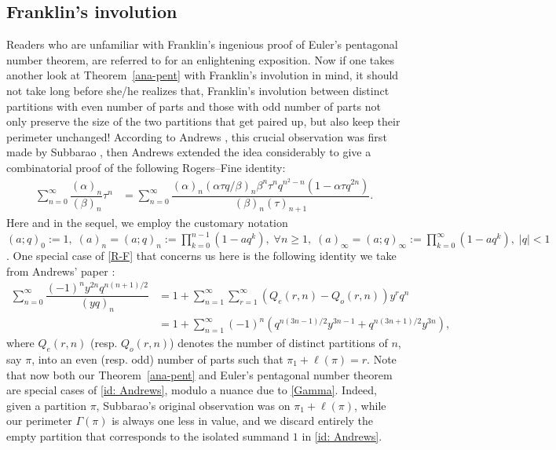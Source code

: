 \documentclass[12pt]{amsart}
\numberwithin{equation}{section}
\theoremstyle{plain}
\theoremstyle{definition}
\begin{document}
\subsection{Franklin's involution}
Readers who are unfamiliar with Franklin's ingenious proof \cite{Fran} of Euler's pentagonal number theorem, are referred to \cite[Section 3.5]{AE} for an enlightening exposition. Now if one takes another look at Theorem~\ref{ana-pent} with Franklin's involution in mind, it should not take long before she/he realizes that, Franklin's involution between distinct partitions with even number of parts and those with odd number of parts not only preserve the size of the two partitions that get paired up, but also keep their perimeter unchanged! According to Andrews \cite{Andr3}, this crucial observation was first made by Subbarao \cite{Sub}, then Andrews \cite{Andr2} extended the idea considerably to give a combinatorial proof of the following Rogers--Fine identity:
\begin{align}\label{R-F}
\sum_{n=0}^{\infty}\dfrac{(\alpha)_n}{(\beta)_n}\tau^n &=\sum_{n=0}^{\infty}\dfrac{(\alpha)_n(\alpha\tau q/\beta)_n\beta^n\tau^nq^{n^2-n}(1-\alpha\tau q^{2n})}{(\beta)_n(\tau)_{n+1}}.
\end{align}
Here and in the sequel, we employ the customary notation $(a;q)_0:=1, \; (a)_n=(a;q)_n:=\prod_{k=0}^{n-1}(1-aq^k), \; \forall n\geq 1,\; (a)_{\infty}=(a;q)_{\infty}:=\prod_{k=0}^{\infty}(1-aq^k), \; |q|<1$.
One special case of \eqref{R-F} that concerns us here is the following identity we take from Andrews' paper \cite[(3.2)$\sim$(3.4)]{Andr2}:
\begin{align}\label{id: Andrews}
\sum\limits_{n=0}^{\infty}\dfrac{(-1)^ny^{2n}q^{n(n+1)/2}}{(yq)_n}&=
1+\sum\limits_{n=1}^{\infty}\sum\limits_{r=1}^{\infty}(Q_{e}(r,n)-Q_{o}(r,n))y^rq^n\\
&=1+\sum\limits_{n=1}^{\infty}(-1)^n(q^{n(3n-1)/2}y^{3n-1}+q^{n(3n+1)/2}y^{3n}),\nonumber
\end{align}
where $Q_e(r,n)$ (resp. $Q_o(r,n)$) denotes the number of distinct partitions of $n$, say $\pi$, into an even (resp. odd) number of parts such that $\pi_1+\ell(\pi)=r$.
Note that now both our Theorem~\ref{ana-pent} and Euler's pentagonal number theorem are special cases of \eqref{id: Andrews}, modulo a nuance due to \eqref{Gamma}. Indeed, given a partition $\pi$, Subbarao's original observation was on $\pi_1+\ell(\pi)$, while our perimeter $\Gamma(\pi)$ is always one less in value, and we discard entirely the empty partition that corresponds to the isolated summand $1$ in \eqref{id: Andrews}.
\end{document}
